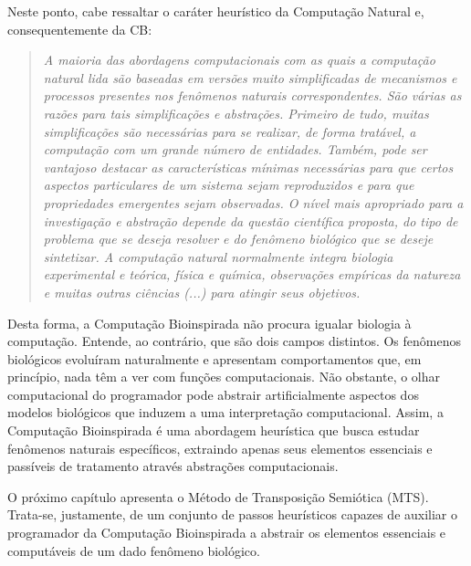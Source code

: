 Neste ponto, cabe ressaltar o caráter heurístico da Computação Natural e, consequentemente da CB: \begin{quote}\textit{A maioria das abordagens computacionais com as quais a computação natural lida são baseadas em versões muito simplificadas de mecanismos e processos presentes nos fenômenos naturais correspondentes. São várias as razões para tais simplificações e abstrações. Primeiro de tudo, muitas simplificações são necessárias para se realizar, de forma tratável, a computação com um grande número de entidades. Também, pode ser vantajoso destacar as características mínimas necessárias para que certos aspectos particulares de um sistema sejam reproduzidos e para que propriedades emergentes sejam observadas. O nível mais apropriado para a investigação e abstração depende da questão científica proposta, do tipo de problema que se deseja resolver e do fenômeno biológico que se deseje sintetizar. A computação natural normalmente integra biologia experimental e teórica, física e química, observações empíricas da natureza e muitas outras ciências (...) para atingir seus objetivos.}~\cite{decastro06}\end{quote}


Desta forma, a Computação Bioinspirada não procura igualar biologia à computação. Entende, ao contrário, que são dois campos distintos. Os fenômenos biológicos evoluíram naturalmente e apresentam comportamentos que, em princípio, nada têm a ver com funções computacionais. Não obstante, o olhar computacional do programador pode abstrair artificialmente aspectos dos modelos biológicos que induzem a uma interpretação computacional. Assim, a Computação Bioinspirada é uma abordagem heurística que busca estudar fenômenos naturais específicos, extraindo apenas seus elementos essenciais e passíveis de tratamento através abstrações computacionais.   

O próximo capítulo apresenta o Método de Transposição Semiótica (MTS). Trata-se, justamente, de um conjunto de passos heurísticos capazes de auxiliar o programador da Computação Bioinspirada a abstrair os elementos essenciais e computáveis de um dado fenômeno biológico.



